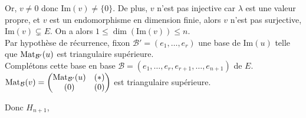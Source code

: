 \documentclass[]{article}
\begin{document}
\begin{itemize}
\begin{itemize}
\begin{itemize}
            Or, $v \neq 0$ donc $\text{Im}(v) \neq \{0\}$. De plus, $v$ n'est pas injective car $\lambda$ est une valeur propre, et $v$ est un endomorphisme en dimension finie, alors $v$ n'est pas surjective, $\text{Im} (v) \subsetneq E$. On a alors $1 \leq \dim(\text{Im}(v)) \leq n$. \\

            Par hypothèse de récurrence, fixon $\mathcal{B}' = (e_1, \dots, e_r)$ une base de $\text{Im}(u)$ telle que $\text{Mat}_{\mathcal{B}'}(u) $ est triangulaire supérieure. \\

            Complétons cette base en base $\mathcal{B} = (e_1, \dots, e_r, e_{r+1}, \dots , e_{n+1})$ de $E$. \\

            $ \text{Mat}_{\mathcal{B}}(v) = \begin{pmatrix}
                \text{Mat}_{\mathcal{B}'}(u) & (*) \\
                (0) & (0)
            \end{pmatrix} $ est triangulaire supérieure. 
        \end{itemize}

        Donc $H_{n+1}$, 
    \end{itemize}
\end{itemize}
\end{document}
